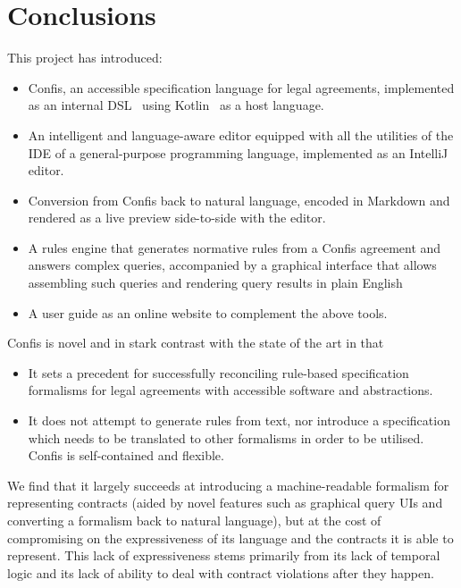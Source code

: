 \chapter{Conclusions}\label{ch:conclusions}



This project has introduced:
\begin{itemize}
    \item Confis, an accessible specification language for legal agreements, implemented as an internal DSL~\cite{fowlerDsl} using Kotlin~\cite{kotlinLang} as a host language.
    \item An intelligent and language-aware editor equipped with all the utilities of the IDE of a general-purpose programming language, implemented as an IntelliJ~\cite{intelliJRepo} editor.
    \item Conversion from Confis back to natural language, encoded in Markdown and rendered as a live preview side-to-side with the editor.
    \item A rules engine that generates normative rules from a Confis agreement and answers complex queries, accompanied by a graphical interface that allows assembling such queries and rendering query results in plain English
    \item A user guide as an online website to complement the above tools.
\end{itemize}

Confis is novel and in stark contrast with the state of the art in that
\begin{itemize}
    \item It sets a precedent for successfully reconciling rule-based specification formalisms for legal agreements with accessible software and abstractions.
    \item It does not attempt to generate rules from text, nor introduce a specification which needs to be translated to other formalisms in order to be utilised.
    Confis is self-contained and flexible.
\end{itemize}

We find that it largely succeeds at introducing a machine-readable formalism for representing contracts (aided by novel features such as graphical query UIs and converting a formalism back to natural language), but at the cost of compromising on the expressiveness of its language and the contracts it is able to represent.
This lack of expressiveness stems primarily from its lack of temporal logic and its lack of ability to deal with contract violations after they happen.


